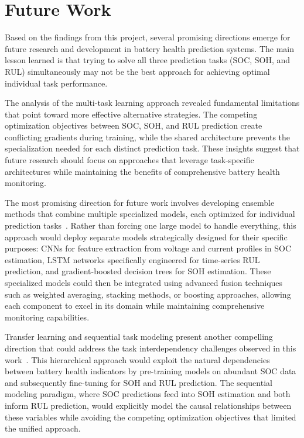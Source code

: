 \section{Future Work}
\label{sec:future_work}

Based on the findings from this project, several promising directions emerge for future research and development in battery health prediction systems. The main lesson learned is that trying to solve all three prediction tasks (SOC, SOH, and RUL) simultaneously may not be the best approach for achieving optimal individual task performance.

The analysis of the multi-task learning approach revealed fundamental limitations that point toward more effective alternative strategies. The competing optimization objectives between SOC, SOH, and RUL prediction create conflicting gradients during training, while the shared architecture prevents the specialization needed for each distinct prediction task. These insights suggest that future research should focus on approaches that leverage task-specific architectures while maintaining the benefits of comprehensive battery health monitoring.

The most promising direction for future work involves developing ensemble methods that combine multiple specialized models, each optimized for individual prediction tasks~\cite{noauthor_pdf_nodate}. Rather than forcing one large model to handle everything, this approach would deploy separate models strategically designed for their specific purposes: CNNs for feature extraction from voltage and current profiles in SOC estimation, LSTM networks specifically engineered for time-series RUL prediction, and gradient-boosted decision trees for SOH estimation. These specialized models could then be integrated using advanced fusion techniques such as weighted averaging, stacking methods, or boosting approaches, allowing each component to excel in its domain while maintaining comprehensive monitoring capabilities.

Transfer learning and sequential task modeling present another compelling direction that could address the task interdependency challenges observed in this work~\cite{zhuang_comprehensive_2021}. This hierarchical approach would exploit the natural dependencies between battery health indicators by pre-training models on abundant SOC data and subsequently fine-tuning for SOH and RUL prediction. The sequential modeling paradigm, where SOC predictions feed into SOH estimation and both inform RUL prediction, would explicitly model the causal relationships between these variables while avoiding the competing optimization objectives that limited the unified approach.

